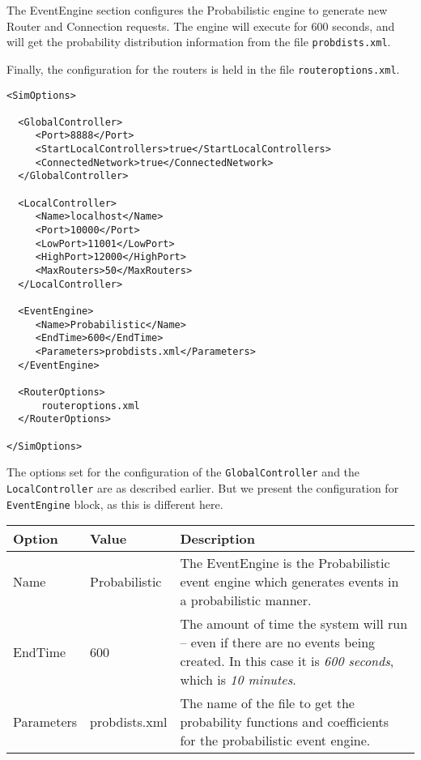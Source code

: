 The EventEngine section configures the Probabilistic engine to
generate new Router and Connection requests.  The engine will execute
for 600 seconds, and will get the probability distribution information
from the file \texttt{probdists.xml}.

Finally, the configuration for the routers is held in the file \texttt{routeroptions.xml}.


\begin{lstlisting}[language=config, caption=control-probabalistic-config.xml]
<SimOptions>

  <GlobalController>
     <Port>8888</Port>
     <StartLocalControllers>true</StartLocalControllers>
     <ConnectedNetwork>true</ConnectedNetwork>
  </GlobalController>

  <LocalController>
     <Name>localhost</Name>
     <Port>10000</Port>
     <LowPort>11001</LowPort>
     <HighPort>12000</HighPort>
     <MaxRouters>50</MaxRouters>
  </LocalController>

  <EventEngine>
     <Name>Probabilistic</Name>
     <EndTime>600</EndTime>
     <Parameters>probdists.xml</Parameters>
  </EventEngine>

  <RouterOptions>
      routeroptions.xml
  </RouterOptions>

</SimOptions>
\end{lstlisting}

\noindent The options set for the configuration of the
\texttt{GlobalController} and the \texttt{LocalController} are as
described earlier.
But we present the configuration for \texttt{EventEngine}
block, as this is different here.


{
\small

\begin{longtable}{ | p{3.4cm} | p{3.1cm} | p{7.3cm} | }

\hline
\textbf{Option} & \textbf{Value} & \textbf{Description} \\
\hline
Name & Probabilistic & The EventEngine is the Probabilistic event
engine which generates events in a probabilistic manner. \\
\hline
EndTime & 600 & The amount of time the system will run -- even if
there are no events being created.  In this case it is \emph{600
  seconds}, which is \emph{10 minutes}. \\
\hline
Parameters & probdists.xml & The name of the file to get the
probability functions and coefficients for the probabilistic event engine. \\
\hline


\end{longtable}

\normalsize
}


